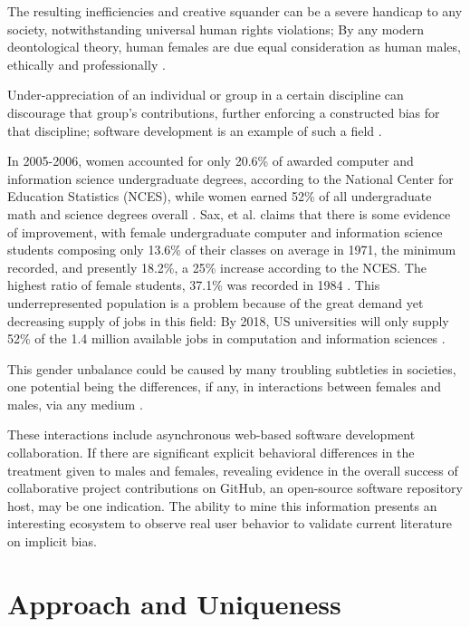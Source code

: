 \documentclass{sigplanconf}
\begin{document}
The resulting inefficiencies and creative
squander can be a severe handicap to any society, notwithstanding universal human rights
violations; By any modern deontological theory, human females are due equal
consideration as human males, ethically and professionally \citep{ethicsgender}.

Under-appreciation of an individual or group in a certain
discipline can discourage that group's contributions, further enforcing a
constructed bias for that discipline; software development is an example of such
a field \citep{genderscience}.

In 2005-2006, women accounted for only 20.6\% of awarded computer and information
science undergraduate degrees, according to the National Center for Education
Statistics (NCES), while women earned 52\% of all undergraduate
math and science degrees overall \citep{genderdiversitycomputing}.
Sax, et al. claims that there is some evidence of improvement, with female
undergraduate computer and information science students composing only 13.6\% of
their classes on average in 1971, the minimum recorded, and presently 18.2\%, a
25\% increase according to the NCES. The highest ratio of female students,
37.1\% was recorded in 1984 \citep{evolutionofwomen}.
This underrepresented population is a problem because of the great demand yet
decreasing supply of jobs in this field: By 2018, US universities will only
supply 52\% of the 1.4 million available jobs in computation and information
sciences \citep{genderdiversitycomputing}.

This gender unbalance could be caused by many troubling subtleties
in societies, one potential being the differences, if any, in interactions
between females and males, via any medium \citep{implicitbias}.

These interactions include asynchronous web-based software development
collaboration. If there are significant explicit behavioral differences in the
treatment given to males and females, revealing evidence in the overall success of
collaborative project contributions on GitHub, an open-source software
repository host, may be one indication. The ability to mine this information
presents an interesting ecosystem to observe real user behavior to validate current
literature on implicit bias.

\section{Approach and Uniqueness}
\end{document}
